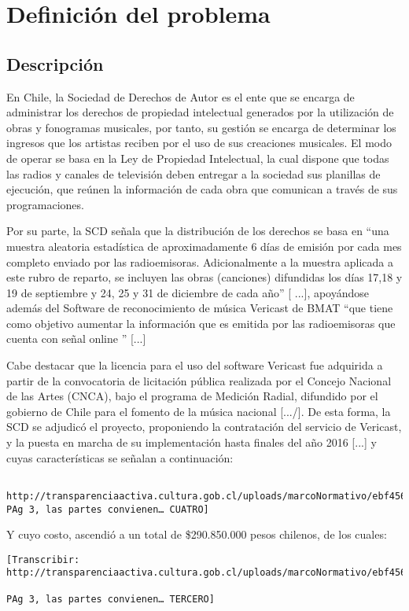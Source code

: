 
\chapter{Definición del problema}

\section{Descripción} \label{sec:Descripcion}

En Chile, la Sociedad de Derechos de Autor es el ente que se encarga de administrar los derechos de propiedad intelectual generados por la utilización de obras y fonogramas musicales, por tanto, su gestión se encarga de determinar los ingresos que los artistas reciben por el uso de sus creaciones musicales. 
El modo de operar se basa en la Ley de Propiedad Intelectual, la cual dispone que todas las radios y canales de televisión deben entregar a la sociedad sus planillas de ejecución, que reúnen la información de cada obra que comunican a través de sus programaciones. 

\bigskip

Por su parte, la SCD señala que la distribución de los derechos se basa en “una muestra aleatoria estadística de aproximadamente 6 días de emisión por cada mes completo enviado por las radioemisoras. Adicionalmente a la muestra aplicada a este rubro de reparto, se incluyen las obras (canciones) difundidas los días 17,18 y 19 de septiembre y 24, 25 y 31 de diciembre de cada año” [ ...], apoyándose además del Software de reconocimiento de música Vericast de BMAT “que tiene como objetivo aumentar la información que es emitida por las radioemisoras que cuenta con señal online ” [...]

\bigskip

Cabe destacar que la licencia para el uso del software Vericast fue adquirida a partir de la convocatoria de licitación pública realizada por el Concejo Nacional de las Artes (CNCA), bajo el programa de Medición Radial, difundido por el gobierno de Chile para el fomento de la música nacional [.../]. De esta forma, la SCD se adjudicó el proyecto, proponiendo la contratación del servicio de Vericast, y la puesta en marcha de su implementación hasta finales del año 2016 [...] y cuyas características se señalan a continuación:


\begin{verbatim}

http://transparenciaactiva.cultura.gob.cl/uploads/marcoNormativo/ebf456ab89212ce3af3173b8f2ebd18c5fc3a123.pdf
PAg 3, las partes convienen… CUATRO]
\end{verbatim}
Y cuyo costo, ascendió a un total de \$290.850.000 pesos chilenos, de los cuales:
\begin{verbatim}[Transcribir: http://transparenciaactiva.cultura.gob.cl/uploads/marcoNormativo/ebf456ab89212ce3af3173b8f2ebd18c5fc3a123.pdf

PAg 3, las partes convienen… TERCERO]
\end{verbatim}

